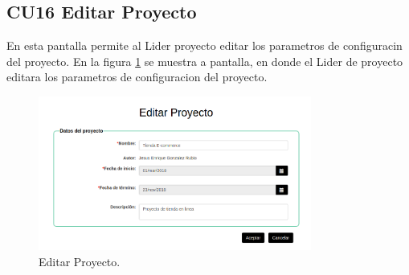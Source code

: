 \subsection{CU16 Editar Proyecto}
{
\justify
{}
}

\justify
En esta pantalla permite al Lider proyecto editar los parametros de configuracin del proyecto.
{
\justify
{}
}
\justify
En la figura \ref{fig:IU16} se muestra a pantalla, en donde el Lider de proyecto editara los parametros de configuracion del proyecto.

\begin{figure}[htb]
\centering
\includegraphics[width=0.8\textwidth]{./images/cu16-editar-proyecto.png}
\caption{Editar Proyecto.} \label{fig:IU16}
\end{figure}